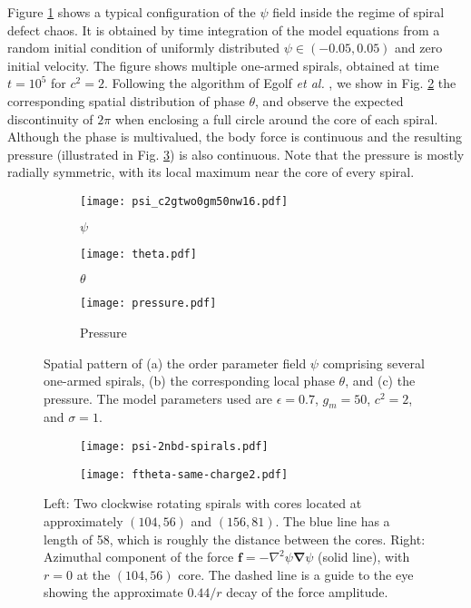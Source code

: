 \documentclass[preprint,prx,floatfix]{revtex4-1}
\begin{document}
Figure \ref{fig:psi} shows a typical configuration of the $\psi$ field inside the regime of spiral defect chaos. It is obtained by time integration of the model equations from a random initial condition of uniformly distributed $\psi \in (-0.05,0.05)$ and zero initial velocity. The figure shows multiple one-armed spirals, obtained at time $t= 10^5$ for $c^{2} = 2$. Following the algorithm of Egolf \textit{et al.} \cite{egolf1998importance}, we show in Fig. \ref{fig:theta} the corresponding spatial distribution of phase $\theta$, and observe the expected discontinuity of $2\pi$ when enclosing a full circle around the core of each spiral. Although the phase is multivalued, the body force is continuous and the resulting pressure (illustrated in Fig. \ref{fig:pressure}) is also continuous. Note that the pressure is mostly radially symmetric, with its local maximum near the core of every spiral.
\begin{figure}[ht]
	\centering
    \begin{subfigure}[b]{0.33\textwidth}
    \texttt{[image: psi\_c2gtwo0gm50nw16.pdf]}
    \caption{$\psi$}
    \label{fig:psi}
    \end{subfigure}
    \hspace{-1mm}
    \begin{subfigure}[b]{0.31\textwidth}
    \texttt{[image: theta.pdf]}
    \caption{$\theta$}
    \label{fig:theta}
    \end{subfigure}
    \hspace{-1mm}
    \begin{subfigure}[b]{0.32\textwidth}
    \texttt{[image: pressure.pdf]}
    \caption{Pressure}
    \label{fig:pressure}
    \end{subfigure}
    \caption{Spatial pattern of (a) the order parameter field $\psi$ comprising several one-armed spirals, (b) the corresponding local phase $\theta$, and (c) the pressure. The model parameters used are $\epsilon = 0.7$, $g_m = 50$, $c^2 = 2$, and $\sigma = 1$.}
	\label{fig:psi-theta}
\end{figure}

\begin{figure}[ht]
    \begin{subfigure}{0.45\textwidth}
        \centering
        \texttt{[image: psi-2nbd-spirals.pdf]}
    \end{subfigure}
    \begin{subfigure}{0.45\textwidth}
        \centering
        \texttt{[image: ftheta-same-charge2.pdf]}
    \end{subfigure}
    \caption{Left: Two clockwise rotating spirals with cores located at approximately $(104,56)$ and $(156,81)$. The blue line has a length of 58, which is roughly the distance between the cores. Right: Azimuthal component of the force $\mathbf{f}=-\nabla^2\psi\bm{\nabla}\psi$ (solid line), with $r = 0$ at the $(104,56)$ core. The dashed line is a guide to the eye showing the approximate $0.44/r$ decay of the force amplitude.}
    \label{fig:same}
\end{figure}
\end{document}

